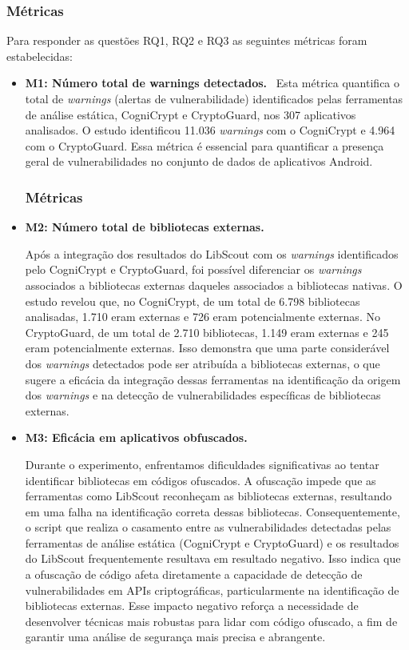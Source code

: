 \subsubsection{Métricas}
Para responder as questões RQ1, RQ2 e RQ3 as seguintes métricas foram estabelecidas:

\begin{itemize}
\item \textbf{M1: Número total de warnings detectados.} \
Esta métrica quantifica o total de \textit{warnings} (alertas de vulnerabilidade) identificados pelas ferramentas de análise estática, CogniCrypt e CryptoGuard, nos 307 aplicativos analisados. O estudo identificou 11.036 \textit{warnings} com o CogniCrypt e 4.964 com o CryptoGuard. Essa métrica é essencial para quantificar a presença geral de vulnerabilidades no conjunto de dados de aplicativos Android.
\subsubsection{Métricas}

\item \textbf{M2: Número total de bibliotecas externas.} \

Após a integração dos resultados do LibScout com os \textit{warnings} identificados pelo CogniCrypt e CryptoGuard, foi possível diferenciar os \textit{warnings} associados a bibliotecas externas daqueles associados a bibliotecas nativas. O estudo revelou que, no CogniCrypt, de um total de 6.798 bibliotecas analisadas, 1.710 eram externas e 726 eram potencialmente externas. No CryptoGuard, de um total de 2.710 bibliotecas, 1.149 eram externas e 245 eram potencialmente externas. Isso demonstra que uma parte considerável dos \textit{warnings} detectados pode ser atribuída a bibliotecas externas, o que sugere a eficácia da integração dessas ferramentas na identificação da origem dos \textit{warnings} e na detecção de vulnerabilidades específicas de bibliotecas externas.

\item \textbf{M3: Eficácia em aplicativos obfuscados.} \

Durante o experimento, enfrentamos dificuldades significativas ao tentar identificar bibliotecas em códigos ofuscados. A ofuscação impede que as ferramentas como LibScout reconheçam as bibliotecas externas, resultando em uma falha na identificação correta dessas bibliotecas. Consequentemente, o script que realiza o casamento entre as vulnerabilidades detectadas pelas ferramentas de análise estática (CogniCrypt e CryptoGuard) e os resultados do LibScout frequentemente resultava em resultado negativo. Isso indica que a ofuscação de código afeta diretamente a capacidade de detecção de vulnerabilidades em APIs criptográficas, particularmente na identificação de bibliotecas externas. Esse impacto negativo reforça a necessidade de desenvolver técnicas mais robustas para lidar com código ofuscado, a fim de garantir uma análise de segurança mais precisa e abrangente.

\end{itemize}

